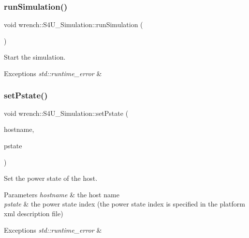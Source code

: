 \subsubsection{\texorpdfstring{run\+Simulation()}{runSimulation()}}
{\footnotesize\ttfamily void wrench\+::\+S4\+U\+\_\+\+Simulation\+::run\+Simulation (\begin{DoxyParamCaption}{ }\end{DoxyParamCaption})}



Start the simulation. 


\begin{DoxyExceptions}{Exceptions}
{\em std\+::runtime\+\_\+error} & \\
\hline
\end{DoxyExceptions}
\mbox{\label{classwrench_1_1_s4_u___simulation_a8ee21fa866cf3bd222e2cbcf27b6d340}} 
\subsubsection{\texorpdfstring{set\+Pstate()}{setPstate()}}
{\footnotesize\ttfamily void wrench\+::\+S4\+U\+\_\+\+Simulation\+::set\+Pstate (\begin{DoxyParamCaption}\item[{const std\+::string \&}]{hostname,  }\item[{int}]{pstate }\end{DoxyParamCaption})\hspace{0.3cm}{\ttfamily [static]}}



Set the power state of the host. 


\begin{DoxyParams}{Parameters}
{\em hostname} & the host name \\
\hline
{\em pstate} & the power state index (the power state index is specified in the platform xml description file) \\
\hline
\end{DoxyParams}

\begin{DoxyExceptions}{Exceptions}
{\em std\+::runtime\+\_\+error} & \\
\hline
\end{DoxyExceptions}
\mbox{\label{classwrench_1_1_s4_u___simulation_a787dce31d634da739172a9f0fb0e8e30}} 
